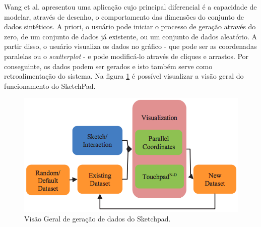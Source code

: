 \documentclass[
	12pt,				%
	openright,			%
	twoside,			%
	a4paper,			%
	english,			%
	brazil				%
	]{abntex2}
\begin{document}
		Wang et al. \cite{BingWang2013} apresentou uma aplicação cujo principal diferencial é a capacidade de modelar, através de desenho, o comportamento das dimensões do conjunto de dados sintéticos. A priori, o usuário pode iniciar o processo de geração através do zero, de um conjunto de dados já existente, ou um conjunto de dados aleatório. A partir disso, o usuário visualiza os dados no gráfico - que pode ser as coordenadas paralelas ou o \emph{scatterplot} - e pode modificá-lo através de cliques e arrastos. Por conseguinte, os dados podem ser gerados e isto também serve como retroalimentação do sistema. Na figura \ref{fig:sketchpad} é possível visualizar a visão geral do funcionamento do SketchPad.
		\begin{figure}[h!]
			\centering
			\includegraphics[width=\linewidth]{./figures/TrabalhosRelacionados/Wang11.png}
			\caption{Visão Geral de geração de dados do Sketchpad.}
			\label{fig:sketchpad}
		\end{figure}
\end{document}
